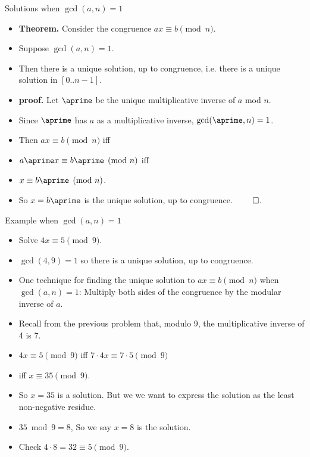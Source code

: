 \documentclass{beamer}
\begin{document}
\begin{frame}{Solutions when $\gcd(a,n)=1$}
\begin{itemize}
  \item \textbf{Theorem.} Consider the congruence $ax\equiv b \pmod n$.
  \item Suppose $\gcd(a,n) = 1$.
  \item Then there is a unique solution, up to congruence, i.e. there is a unique solution in $[0..n-1]$.
  \item \textbf{proof.} Let $\aprime$ be the unique multiplicative inverse
  of $a$ mod $n $.
  \item Since $\aprime$ has $a$ as a multiplicative inverse, $\gcd(\aprime,n)=1$.
  \item Then $ax\equiv b \pmod n$ iff
  \item $a\aprime x\equiv b\aprime \pmod n$ iff
  \item $x \equiv b\aprime \pmod n$.
  \item So $x=b\aprime$ is the unique solution, up to congruence. $\qed$.
\end{itemize}
\end{frame}

\begin{frame}{Example when $\gcd(a,n)=1$}
\begin{itemize}
  \item Solve $4x \equiv 5 \pmod 9$.
  \item $\gcd(4,9) = 1$ so there is a unique solution, up to congruence.
  \item One technique for finding the unique solution to $ax\equiv b \pmod n$ when $\gcd(a,n)=1$:
  Multiply both sides of the congruence by the modular inverse of $a$.
  \item Recall from the previous problem that, modulo 9, the multiplicative inverse of 4 is 7.
  \item $4x \equiv 5 \pmod 9$ iff $7\cdot 4 x  \equiv 7\cdot 5  \pmod 9$
  \item iff $x \equiv 35 \pmod 9$.
  \item So  $x=35$ is a solution. But we we want to express the solution as the least non-negative residue.
  \item $35\bmod 9 = 8$, So we say $x=8$ is the solution.
  \item Check $4\cdot 8 = 32 \equiv 5 \pmod 9$.
\end{itemize}
\end{frame}
\end{document}
